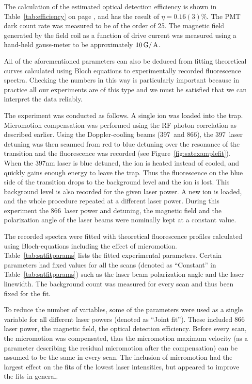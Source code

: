 The calculation of the estimated optical detection efficiency is shown in Table~\ref{tab:efficiency} on page \pageref{tab:efficiency}, and has the result of $\eta = 0.16(3)\%$. The PMT dark count rate was measured to be of the order of 25\Hz \cite{Myerson2007}. The magnetic field generated by the field coil as a function of drive current was measured using a hand-held gauss-meter to be approximately $10\,\mbox{G}/\,\mbox{A}$. 

All of the aforementioned parameters can also be deduced from fitting theoretical curves calculated using Bloch equations to experimentally recorded fluorescence spectra. Checking the numbers in this way is particularly important because in practice all our experiments are of this type and we must be satisfied that we can interpret the data reliably.

The experiment was conducted as follows. A single ion was loaded into the trap. Micromotion compensation was performed using the RF-photon correlation as described earlier. Using the Doppler-cooling beams (397\nm\, and 866\nm), the 397\nm\, laser detuning was then scanned from red to blue detuning over the resonance of the transition and the fluorescence was recorded (see Figure~\ref{fig:satexamplefit}). When the 397nm laser is blue detuned, the ion is heated instead of cooled, and quickly gains enough energy to leave the trap. Thus the fluorescence on the blue side of the transition drops to the background level and the ion is lost. This background level is also recorded for the given laser power. A new ion is loaded, and the whole procedure repeated at a different laser power. During this experiment the 866\nm\, laser power and detuning, the magnetic field and the polarization angle of the laser beams were nominally kept at a constant value. 

The recorded spectra were fitted with theoretical fluorescence profiles calculated using Bloch-equations including the effect of micromotion. Table~\ref{tab:satfitparams} lists the fitted experimental parameters. Certain parameters had fixed values for all the scans (denoted as ``Constant'' in Table~\ref{tab:satfitparams}) such as the laser beam polarization angle and the laser linewidth. The background count was measured for every scan and thus been fixed for the fit.

To reduce the number of variables, some of the parameters were used as a single variable for all different laser powers (denoted as ``Joint fit''). These included 866\nm\, laser power, the magnetic field, the optical detection efficiency. Before every scan, the micromotion was compensated, thus the micromotion maximum velocity (as a parameter describing the residual micromotion after the compensation) can be assumed to be the same in every scan. The inclusion of micromotion had the largest effect on the fits of the lowest laser intensities, but appeared to improve the fits in general.

